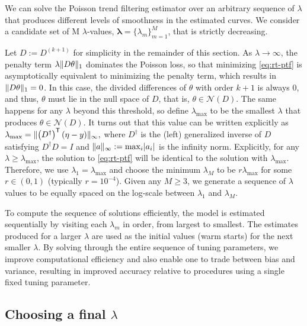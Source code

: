 We can solve the Poisson trend filtering estimator over an arbitrary sequence of 
$\lambda$ that produces different levels of smoothness in the estimated curves. 
We consider a candidate set of M $\lambda$-values, $\boldsymbol{\lambda} = \{\lambda_m\}_{m=1}^M$,
that is strictly decreasing.


Let $D := D^{(k+1)}$ for simplicity in the remainder of this section. As
$\lambda \to\infty$, the penalty term $\lambda \lVert D\theta \rVert_1$ dominates the
Poisson loss, so that minimizing \eqref{eq:rt-ptf} is asymptotically equivalent
to minimizing the penalty term, which results in $\lVert D\theta \rVert_1 = 0$. In
this case, the divided differences of $\theta$ with order $k+1$ is always $0$,
and thus, $\theta$ must lie in the null space of $D$, that is,
$\theta\in\mathcal{N}(D)$. The same happens for any $\lambda$ beyond this
threshold, so define $\lambda_{\textrm{max}}$ to be the smallest $\lambda$ that
produces $\theta\in\mathcal{N}(D)$. It turns out that this value can be written
explicitly as $\lambda_{\textrm{max}} = \lVert \left(D^{\dagger}\right)^{\mathsf{T}} \left(\eta
- y\right) \rVert_{\infty},$ where $D^{\dagger}$ is the (left) generalized inverse of $D$
satisfying $D^{\dagger} D = I$ and $\lVert a \rVert_{\infty} :=
\mathrm{max}_{i}|a_i|$ is the infinity norm. Explicitly, for any $\lambda \geq
\lambda_{\max}$, the solution to \eqref{eq:rt-ptf} will be identical to the
solution with $\lambda_{\max}$. Therefore, we use
$\lambda_1 = \lambda_{\max}$ and choose the minimum $\lambda_M$ to
be $r\lambda_{\max}$ for some $r \in (0,1)$ (typically $r=10^{-4}$). Given any
$M\geq 3$, we generate a sequence of $\lambda$ values to be equally spaced on
the log-scale between $\lambda_1$ and $\lambda_M$. 

To compute the sequence of solutions efficiently, the model is estimated
sequentially by visiting each $\lambda_m$ in order, from largest to smallest. The
estimates produced for a larger $\lambda$ are used as the initial values (warm
starts) for the next smaller $\lambda$. By solving through the entire sequence
of tuning parameters, we improve computational efficiency and also enable one to
trade between bias and variance, resulting in improved accuracy relative to
procedures using a single fixed tuning parameter.


\subsection{Choosing a final $\lambda$}
\label{sec:cv}

